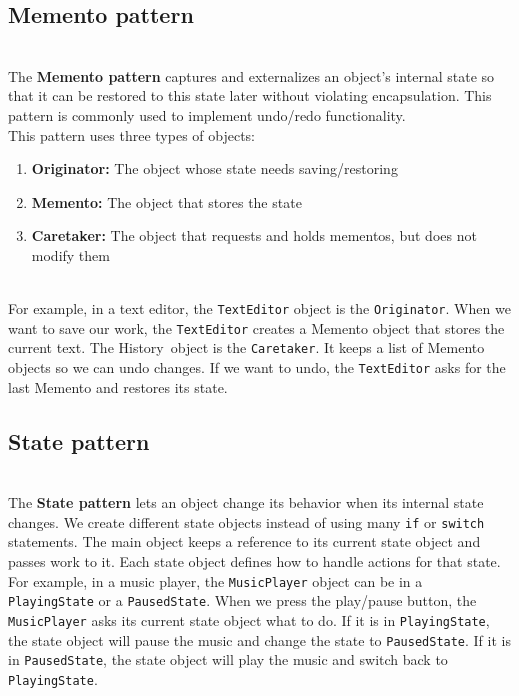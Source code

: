 \subsection{Memento pattern}\label{WwSeTB98GMR-03TWka7fe}
\\
The \textbf{Memento pattern} captures and externalizes an object's internal state so that it can be restored to this state later without violating encapsulation. This pattern is commonly used to implement undo/redo functionality.
\\
This pattern uses three types of objects:~

\begin{enumerate}
\item
\protect{}\label{Stk1xOMWP1HVjMzGGLFi-}
\textbf{Originator:} The object whose state needs saving/restoring
\item
\protect{}\label{7MQyX0p007wFipetkgaTL}
\textbf{Memento:} The object that stores the state
\item
\protect{}\label{7kIYPs3IxjnnCBE5UsgxJ}
\textbf{Caretaker:} The object that requests and holds mementos, but does not modify them
\end{enumerate}
\\
For example, in a text editor, the \texttt{TextEditor} object is the \texttt{Originator}. When we want to save our work, the \texttt{TextEditor} creates a Memento object that stores the current text. The History\ object is the \texttt{Caretaker}. It keeps a list of Memento objects so we can undo changes. If we want to undo, the \texttt{TextEditor} asks for the last Memento and restores its state.

\subsection{State pattern}\label{0BjR5YSu3eD8dc5Cn_I0I}
\\
The \textbf{State pattern} lets an object change its behavior when its internal state changes. We create different state objects instead of using many \texttt{if} or \texttt{switch} statements. The main object keeps a reference to its current state object and passes work to it. Each state object defines how to handle actions for that state.
\\
For example, in a music player, the \texttt{MusicPlayer} object can be in a \texttt{PlayingState} or a \texttt{PausedState}. When we press the play/pause button, the \texttt{MusicPlayer} asks its current state object what to do. If it is in \texttt{PlayingState}, the state object will pause the music and change the state to \texttt{PausedState}. If it is in \texttt{PausedState}, the state object will play the music and switch back to \texttt{PlayingState}.

